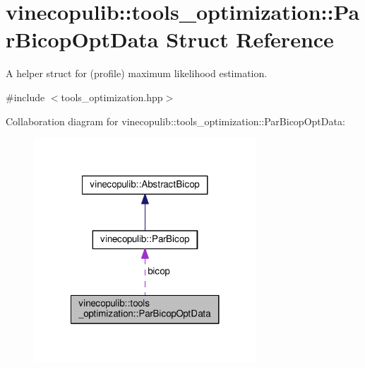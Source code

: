 \hypertarget{structvinecopulib_1_1tools__optimization_1_1_par_bicop_opt_data}{\section{vinecopulib\+:\+:tools\+\_\+optimization\+:\+:Par\+Bicop\+Opt\+Data Struct Reference}
\label{structvinecopulib_1_1tools__optimization_1_1_par_bicop_opt_data}
}


A helper struct for (profile) maximum likelihood estimation.  




{\ttfamily \#include $<$tools\+\_\+optimization.\+hpp$>$}



Collaboration diagram for vinecopulib\+:\+:tools\+\_\+optimization\+:\+:Par\+Bicop\+Opt\+Data\+:\nopagebreak
\begin{figure}[H]
\begin{center}
\leavevmode
\includegraphics[width=236pt]{structvinecopulib_1_1tools__optimization_1_1_par_bicop_opt_data__coll__graph}
\end{center}
\end{figure}
